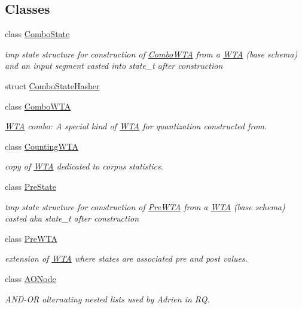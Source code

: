 \subsection*{Classes}
\begin{DoxyCompactItemize}
\item 
class \mbox{\hyperlink{classComboState}{Combo\+State}}
\begin{DoxyCompactList}\small\item\em tmp state structure for construction of \mbox{\hyperlink{classComboWTA}{Combo\+W\+TA}} from a \mbox{\hyperlink{classWTA}{W\+TA}} (base schema) and an input segment casted into state\+\_\+t after construction \end{DoxyCompactList}\item 
struct \mbox{\hyperlink{structComboStateHasher}{Combo\+State\+Hasher}}
\item 
class \mbox{\hyperlink{classComboWTA}{Combo\+W\+TA}}
\begin{DoxyCompactList}\small\item\em \mbox{\hyperlink{classWTA}{W\+TA}} combo\+: A special kind of \mbox{\hyperlink{classWTA}{W\+TA}} for quantization constructed from. \end{DoxyCompactList}\item 
class \mbox{\hyperlink{classCountingWTA}{Counting\+W\+TA}}
\begin{DoxyCompactList}\small\item\em copy of \mbox{\hyperlink{classWTA}{W\+TA}} dedicated to corpus statistics. \end{DoxyCompactList}\item 
class \mbox{\hyperlink{classPreState}{Pre\+State}}
\begin{DoxyCompactList}\small\item\em tmp state structure for construction of \mbox{\hyperlink{classPreWTA}{Pre\+W\+TA}} from a \mbox{\hyperlink{classWTA}{W\+TA}} (base schema) casted aka state\+\_\+t after construction \end{DoxyCompactList}\item 
class \mbox{\hyperlink{classPreWTA}{Pre\+W\+TA}}
\begin{DoxyCompactList}\small\item\em extension of \mbox{\hyperlink{classWTA}{W\+TA}} where states are associated pre and post values. \end{DoxyCompactList}\item 
class \mbox{\hyperlink{classAONode}{A\+O\+Node}}
\begin{DoxyCompactList}\small\item\em A\+N\+D-\/\+OR alternating nested lists used by Adrien in RQ. \end{DoxyCompactList}\item 

\end{DoxyCompactItemize}
